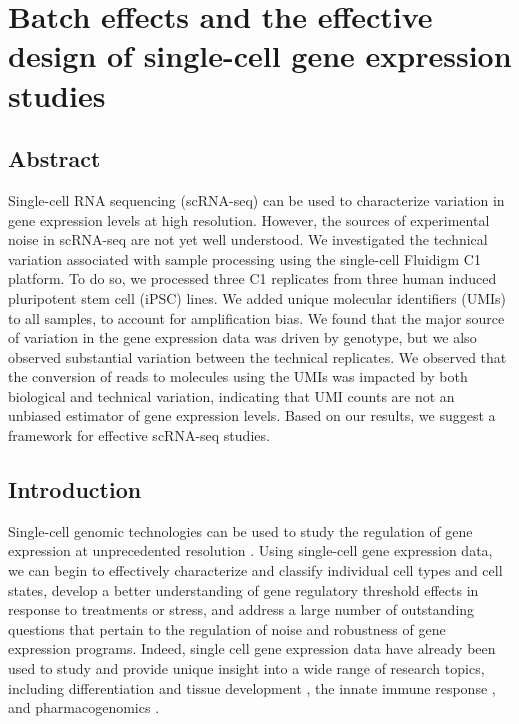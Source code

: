 \chapter{Batch effects and the effective design of single-cell gene expression studies}\label{ch:singleCellSeq}

\section[Abstract]{Abstract\footnotemark}

Single-cell RNA sequencing (scRNA-seq) can be used to characterize
variation in gene expression levels at high resolution. However, the
sources of experimental noise in scRNA-seq are not yet well understood.
We investigated the technical variation associated with sample
processing using the single-cell Fluidigm C1 platform. To do so, we
processed three C1 replicates from three human induced pluripotent stem
cell (iPSC) lines. We added unique molecular identifiers (UMIs) to all
samples, to account for amplification bias. We found that the major
source of variation in the gene expression data was driven by genotype,
but we also observed substantial variation between the technical
replicates. We observed that the conversion of reads to molecules using
the UMIs was impacted by both biological and technical variation,
indicating that UMI counts are not an unbiased estimator of gene
expression levels. Based on our results, we suggest a framework for
effective scRNA-seq studies.


\section{Introduction}\label{ch04-introduction}

Single-cell genomic technologies can be used to study the regulation of
gene expression at unprecedented resolution \citep{Macaulay2014,
Saliba2014}. Using single-cell gene expression data, we can begin to
effectively characterize and classify individual cell types and cell
states, develop a better understanding of gene regulatory threshold
effects in response to treatments or stress, and address a large number
of outstanding questions that pertain to the regulation of noise and
robustness of gene expression programs. Indeed, single cell gene
expression data have already been used to study and provide unique
insight into a wide range of research topics, including differentiation
and tissue development \citep{Macosko2015, Handel2016, Drissen2016},
the innate immune response \citep{Shalek2013, Jaitin2014}, and
pharmacogenomics \citep{Miyamoto2015, Kim2015}.


